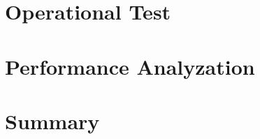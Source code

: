 

\section{Operational Test}
\label{sec:operational-test}


\section{Performance Analyzation}
\label{sec:performance-analyzation}


\section{Summary}
\label{sec:evaluation-summary}


%
%

